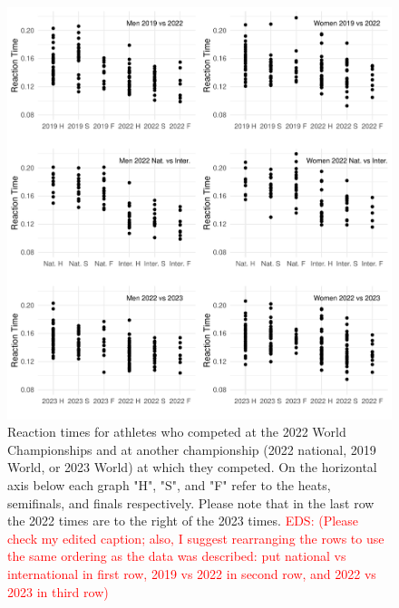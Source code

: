 \documentclass[12pt, letterpaper]{article}
\newcommand{\eds}[1]{\textcolor{red}{EDS: (#1)}}
\begin{document}
\begin{figure}[tbp]
  \centering
  \includegraphics{RankScatterPlots}
  \caption{Reaction times for athletes who competed at the 2022 World Championships
	and at another championship (2022 national, 2019 World, or 2023 World) at which 
	they competed. On the horizontal
  axis below each graph "H", "S", and "F" refer to the heats, semifinals, and 
  finals respectively. Please note that in the last row the 2022 times are to
  the right of the 2023 times.
	\eds{Please check my edited caption; also, I suggest rearranging the rows to 
	use the same ordering as the data was described: put national vs international 
	in first row, 2019 vs 2022 in second row, and 2022 vs 2023 in third row}
	}
  \label{fig:RankScatterplots}
\end{figure}
\end{document}

